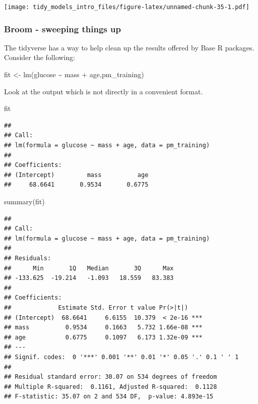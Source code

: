 \documentclass[
]{article}
\newenvironment{Shaded}{\begin{snugshade}}{\end{snugshade}}
\newcommand{\FunctionTok}[1]{\textcolor[rgb]{0.00,0.00,0.00}{#1}}
\newcommand{\NormalTok}[1]{#1}
\newcommand{\OtherTok}[1]{\textcolor[rgb]{0.56,0.35,0.01}{#1}}
\newcommand{\SpecialCharTok}[1]{\textcolor[rgb]{0.00,0.00,0.00}{#1}}
\begin{document}
\texttt{[image: tidy\_models\_intro\_files/figure-latex/unnamed-chunk-35-1.pdf]}

\hypertarget{broom---sweeping-things-up}{%
\subsubsection{Broom - sweeping things
up}\label{broom---sweeping-things-up}}

The tidyverse has a way to help clean up the results offered by Base R
packages. Consider the following:

\begin{Shaded}
\begin{Highlighting}[]
\NormalTok{fit }\OtherTok{\textless{}{-}} \FunctionTok{lm}\NormalTok{(glucose }\SpecialCharTok{\textasciitilde{}}\NormalTok{ mass }\SpecialCharTok{+}\NormalTok{ age,pm\_training)}
\end{Highlighting}
\end{Shaded}

Look at the output which is not directly in a convenient format.

\begin{Shaded}
\begin{Highlighting}[]
\NormalTok{fit}
\end{Highlighting}
\end{Shaded}

\begin{verbatim}
## 
## Call:
## lm(formula = glucose ~ mass + age, data = pm_training)
## 
## Coefficients:
## (Intercept)         mass          age  
##     68.6641       0.9534       0.6775
\end{verbatim}

\begin{Shaded}
\begin{Highlighting}[]
\FunctionTok{summary}\NormalTok{(fit)}
\end{Highlighting}
\end{Shaded}

\begin{verbatim}
## 
## Call:
## lm(formula = glucose ~ mass + age, data = pm_training)
## 
## Residuals:
##      Min       1Q   Median       3Q      Max 
## -133.625  -19.214   -1.093   18.559   83.383 
## 
## Coefficients:
##             Estimate Std. Error t value Pr(>|t|)    
## (Intercept)  68.6641     6.6155  10.379  < 2e-16 ***
## mass          0.9534     0.1663   5.732 1.66e-08 ***
## age           0.6775     0.1097   6.173 1.32e-09 ***
## ---
## Signif. codes:  0 '***' 0.001 '**' 0.01 '*' 0.05 '.' 0.1 ' ' 1
## 
## Residual standard error: 30.07 on 534 degrees of freedom
## Multiple R-squared:  0.1161, Adjusted R-squared:  0.1128 
## F-statistic: 35.07 on 2 and 534 DF,  p-value: 4.893e-15
\end{verbatim}
\end{document}
